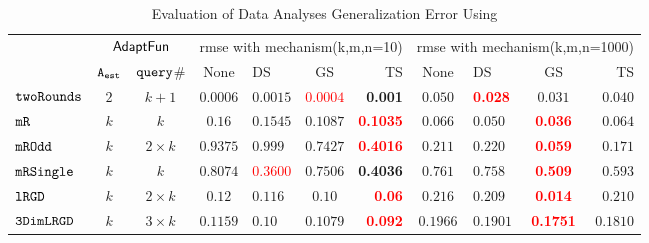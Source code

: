 {\footnotesize
\begin {table}[t]
        \caption{Evaluation of Data Analyses Generalization Error Using {\THESYSTEM}}
    \vspace{-0.4cm}
        \label{tb:adapt-generalization}
        \begin{center}
        \centering
{
        \begin{tabular}{|| >{\tiny}l || c | c || c | l | c | r || c | l | c | r || }
                \hhline{t|:=========== :t:|}
        \multirow{2}{*}{Program $c$}
         & \multicolumn{2}{c||}{$\textsf{AdaptFun}$}
         & \multicolumn{4}{c||}{rmse with mechanism(k,m,n=10)}  & \multicolumn{4}{c||}{rmse with mechanism(k,m,n=1000)}  \\ 
         \hhline{||~--||----||----||}
         & {${\mathtt{A_{est}}}$ } & {${\tt query}$\# }  & None  & DS & GS & TS & None & DS & GS & TS \\ 
         \hline \hline
        $  \mathtt{ twoRounds }$ & $ 2 $ & $  k + 1 $  & $0.0006$   & {{$0.0015$}} & \textcolor{red}{$0.0004$} & \textbf{0.001}& $0.050$   & \textcolor{red}{\textbf{0.028}} & {$0.031$} & $0.040$  \\
        \hhline{||-||---||-||--||----||}
         $  \mathtt{ mR}$ & $k$ & $k$  & $0.16$   & $0.1545$  & $0.1087 $ & \textcolor{red}{\textbf{0.1035}}  & $0.066$   & $0.050$ & \textcolor{red}{\textbf{0.036}} & $0.064$  \\
         \hhline{||-||---||-||--||----||}
         $  \mathtt{ mROdd }$ & $ k $   & $  2 \times k $ & $0.9375$   & $0.999$ & $0.7427$ & \textcolor{red}{\textbf{0.4016}} & $0.211$   & $0.220$ & \textcolor{red}{\textbf{0.059}} & $0.171$  \\
         \hhline{||-||---||-||--||----||}
         $  \mathtt{ mRSingle }$ & $ k $ & $  k $  & $0.8074$   & \textcolor{red}{$0.3600$} & $ 0.7506$ & {\textbf{0.4036}} & $ 0.761$   & $ 0.758$ & \textcolor{red}{\textbf{0.509}} & $ 0.593$  \\
         \hhline{||-||---||-||--||----||}
         $  \mathtt{ lRGD }$ & $ k $ & $  2\times k $  & $0.12$   & $0.116$ & $ 0.10 $ & \textcolor{red}{\textbf{0.06}} & $0.216$   & $0.209$ & \textcolor{red}{\textbf{0.014}} & $0.210$  \\
         \hhline{||-||---||-||--||----||}
         $  \mathtt{ 3DimLRGD }$ & $ k $ & $  3\times k $  & $0.1159$   & $0.10$ & $0.1079$ & \textcolor{red}{\textbf{0.092}} & $0.1966$   & $0.1901$ & \textcolor{red}{\textbf{0.1751}} & $0.1810$  \\

\end{tabular}}
\end{center}
\end{table}}
